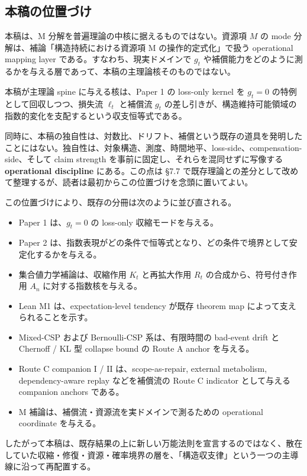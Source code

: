 \documentclass[12pt,a4paper]{article}
\begin{document}
\subsection{本稿の位置づけ}\label{ux672cux7a3fux306eux4f4dux7f6eux3065ux3051}

本稿は、M 分解を普遍理論の中核に据えるものではない。資源項 \(M\) の mode 分解は、補論「構造持続における資源項 M の操作的定式化」で扱う operational mapping layer である。すなわち、現実ドメインで \(g_{t}\) や補償能力をどのように測るかを与える層であって、本稿の主理論核そのものではない。

本稿が主理論 spine に与える核は、Paper 1 の loss-only kernel を \(g_{t}=0\) の特例として回収しつつ、損失流 \(\ell_{t}\) と補償流 \(g_{t}\) の差し引きが、構造維持可能領域の指数的変化を支配するという収支恒等式である。

同時に、本稿の独自性は、対数比、ドリフト、補償という既存の道具を発明したことにはない。独自性は、対象構造、測度、時間地平、loss-side、compensation-side、そして claim strength を事前に固定し、それらを混同せずに写像する \textbf{operational discipline} にある。この点は §7.7 で既存理論との差分として改めて整理するが、読者は最初からこの位置づけを念頭に置いてよい。

この位置づけにより、既存の分冊は次のように並び直される。

\begin{itemize}
\tightlist
\item
  Paper 1 は、\(g_{t}=0\) の loss-only 収縮モードを与える。
\item
  Paper 2 は、指数表現がどの条件で恒等式となり、どの条件で境界として安定化するかを与える。
\item
  集合値力学補論は、収縮作用 \(K_{t}\) と再拡大作用 \(R_{t}\) の合成から、符号付き作用 \(A_{n}\) に対する指数核を与える。
\item
  Lean M1 は、expectation-level tendency が既存 theorem map によって支えられることを示す。
\item
  Mixed-CSP および Bernoulli-CSP 系は、有限時間の bad-event drift と Chernoff / KL 型 collapse bound の Route A anchor を与える。
\item
  Route C companion I / II は、scope-as-repair, external metabolism, dependency-aware replay などを補償流の Route C indicator として与える companion anchors である。
\item
  M 補論は、補償流・資源流を実ドメインで測るための operational coordinate を与える。
\end{itemize}

したがって本稿は、既存結果の上に新しい万能法則を宣言するのではなく、散在していた収縮・修復・資源・確率境界の層を、「構造収支律」という一つの主導線に沿って再配置する。
\end{document}
